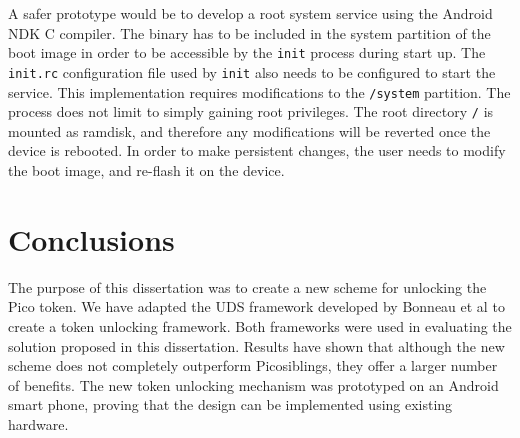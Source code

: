 A safer prototype would be to develop a root system service using the Android NDK C compiler. The binary has to be included in the system partition of the boot image in order to be accessible by the {\tt init} process during start up. The {\tt init.rc} configuration file used by {\tt init} also needs to be configured to start the service. This implementation requires modifications to the {\tt /system} partition. The process does not limit to simply gaining root privileges. The root directory {\tt /} is mounted as ramdisk, and therefore any modifications will be reverted once the device is rebooted. In order to make persistent changes, the user needs to modify the boot image, and re-flash it on the device.

\section{Conclusions}
The purpose of this dissertation was to create a new scheme for unlocking the Pico token. We have adapted the UDS framework developed by Bonneau et al \cite{bonneau2012quest} to create a token unlocking framework. Both frameworks were used in evaluating the solution proposed in this dissertation. Results have shown that although the new scheme does not completely outperform Picosiblings, they offer a larger number of benefits. The new token unlocking mechanism was prototyped on an Android smart phone, proving that the design can be implemented using existing hardware.


